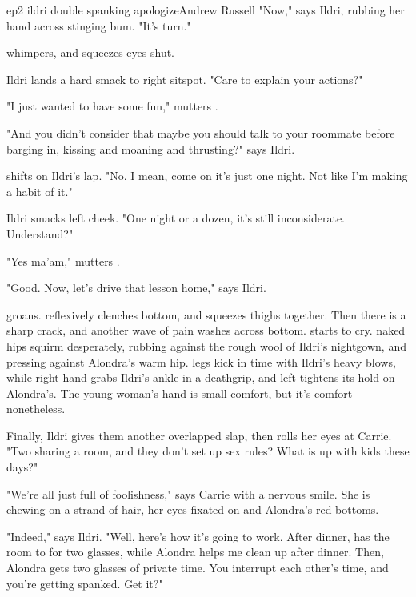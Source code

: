 \documentclass{book}
\begin{document}
\begin{childnode}{ep2 ildri double spanking apologize}{Andrew Russell}
    "Now," says Ildri, rubbing her hand across \names{} stinging bum. "It's \nicknames{} turn."

    \name{} whimpers, and squeezes \hisher{} eyes shut.

    Ildri lands a hard smack to \names{} right sitspot. "Care to explain your actions?"

    "I just wanted to have some fun," mutters \name{}. 

    "And you didn't consider that maybe you should talk to your roommate before barging in, kissing and moaning and thrusting?" says Ildri.

    \name{} shifts on Ildri's lap. "No. I mean, come on it's just one night. Not like I'm making a habit of it."

    Ildri smacks \names{} left cheek. "One night or a dozen, it's still inconsiderate. Understand?"

    "Yes ma'am," mutters \name{}.

    "Good. Now, let's drive that lesson home," says Ildri. 

    \name{} groans. \HeShe{} reflexively clenches \hisher{} bottom, and squeezes \hisher{} thighs together. Then there is a sharp crack, and another wave of pain washes across \names{} bottom.
    \name{} starts to cry. \HisHer{} naked hips squirm desperately, rubbing against the rough wool of Ildri's nightgown, and pressing against 
    Alondra's warm hip. \HisHer{} legs kick in time with Ildri's heavy blows, while \hisher{} right hand grabs Ildri's ankle in a deathgrip, and 
    \hisher{} left tightens its hold on Alondra's. The young woman's hand is small comfort, but it's comfort nonetheless.

    Finally, Ildri gives them another overlapped slap, then rolls her eyes at Carrie. "Two  sharing a room, and they don't set up sex rules? What is up with 
    kids these days?" 

    "We're all just full of foolishness," says Carrie with a nervous smile. She is chewing on a strand of hair, her eyes fixated on \names{} and Alondra's red bottoms.

    "Indeed," says Ildri. "Well, here's how it's going to work. After dinner, \name{} has the room to \himselfherself{} for two glasses, while Alondra helps me clean up after dinner. Then, Alondra gets two glasses of 
    private time. You interrupt each other's time, and you're getting spanked. Get it?"


\end{childnode}
\end{document}
